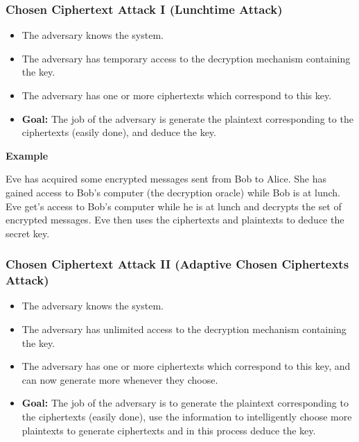 \subsubsection*{Chosen Ciphertext Attack I (Lunchtime Attack)}

\begin{itemize}
\item The adversary knows the system.
\item The adversary has temporary access to the decryption mechanism containing the key.
\item The adversary has one or more ciphertexts which correspond to this key. 
\item \textbf{Goal:} The job of the adversary is generate the plaintext corresponding to the ciphertexts (easily done), and deduce the key.
\end{itemize}

\textbf{Example}


Eve has acquired some  encrypted messages sent from Bob to Alice.
She has gained access to Bob’s computer (the decryption oracle) while Bob is at lunch.
Eve get’s access to Bob’s computer while he is at lunch and decrypts the set of encrypted messages.
Eve then uses the ciphertexts and plaintexts to deduce the secret key.


\subsubsection*{Chosen Ciphertext Attack II (Adaptive Chosen Ciphertexts Attack)}

\begin{itemize}
\item The adversary knows the system.
\item The adversary has unlimited access to the decryption mechanism containing the key.
\item The adversary has one or more ciphertexts which correspond to this key, and can now generate more whenever they choose.
\item \textbf{Goal:} The job of the adversary is to generate the plaintext corresponding to the ciphertexts (easily done), use the information to intelligently choose more plaintexts to generate ciphertexts and in this process deduce the key.
\end{itemize}